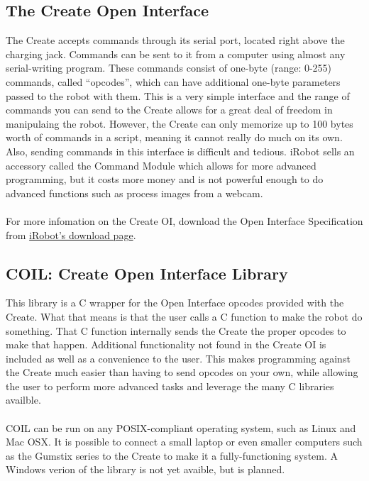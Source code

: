 \documentclass {article}
\begin{document}
\subsection {The Create Open Interface}
The Create accepts commands through its serial port, located right above the charging jack.
Commands can be sent to it from a computer using almost any serial-writing program.  These commands
consist of one-byte (range: 0-255) commands, called ``opcodes'', which can have additional one-byte
parameters passed to the robot with them.  This is a very simple interface and the range of commands
you can send to the Create allows for a great deal of freedom in manipulaing the robot.  However,
the Create can only memorize up to 100 bytes worth of commands in a script, meaning it cannot really
do much on its own.  Also, sending commands in this interface is difficult and tedious.  iRobot
sells an accessory called the Command Module which allows for more advanced programming, but it
costs more money and is not powerful enough to do advanced functions such as process images from a
webcam. \\
\\
For more infomation on the Create OI, download the Open Interface Specification from
\href{http://www.irobot.com/sp.cfm?pageid=294}{iRobot's download page}.

\subsection {COIL:  Create Open Interface Library}
This library is a C wrapper for the Open Interface opcodes provided with the Create.  What that
means is that the user calls a C function to make the robot do something.  That C function
internally sends the Create the proper opcodes to make that happen.  Additional functionality not
found in the Create OI is included as well as a convenience to the user.  This makes programming
against the Create much easier than having to send opcodes on your own, while allowing the user to
perform more advanced tasks and leverage the many C libraries availble. \\
\\
COIL can be run on any POSIX-compliant operating system, such as Linux and Mac OSX.  It is possible
to connect a small laptop or even smaller computers such as the Gumstix series to the Create to make
it a fully-functioning system.  A Windows verion of the library is not yet avaible, but is planned.

\newpage
\end{document}
